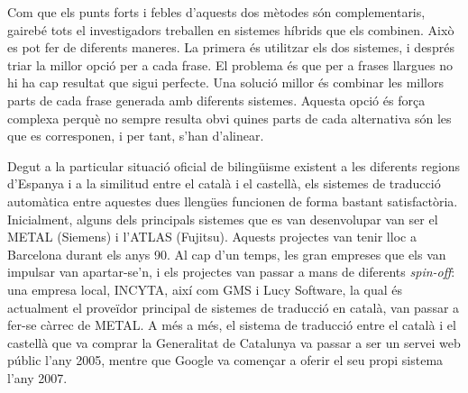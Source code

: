 \begin{multicols}{2}
Com que els punts forts i febles d’aquests dos mètodes són complementaris, gairebé tots el investigadors treballen en sistemes híbrids que els combinen. Això es pot fer de diferents maneres. La primera és utilitzar els dos sistemes, i després triar la millor opció per a cada frase. El problema és que per a frases llargues no hi ha cap resultat que sigui perfecte. Una solució millor és combinar les millors parts de cada frase generada amb diferents sistemes. Aquesta opció és força complexa perquè no sempre resulta obvi quines parts de cada alternativa són les que es corresponen, i per tant, s’han d’alinear.

Degut a la particular situació oficial de bilingüisme existent a les diferents regions d’Espanya i a la similitud entre el català i el castellà, els sistemes de traducció automàtica entre aquestes dues llengües funcionen de forma bastant satisfactòria. Inicialment, alguns dels principals sistemes que es van desenvolupar van ser el METAL (Siemens) i l’ATLAS (Fujitsu). Aquests projectes van tenir lloc a Barcelona durant els anys 90. Al cap d’un temps, les gran empreses que els van impulsar van apartar-se’n, i els projectes van passar a mans de diferents \textit{spin-off}: una empresa local, INCYTA, així com GMS i Lucy Software, la qual és actualment el proveïdor principal de sistemes de traducció en català, van passar a fer-se càrrec de METAL. A més a més, el sistema de traducció entre el català i el castellà que va comprar la Generalitat de Catalunya va passar a ser un servei web públic l’any 2005, mentre que Google va començar a oferir el seu propi sistema l’any 2007.


\end{multicols}
